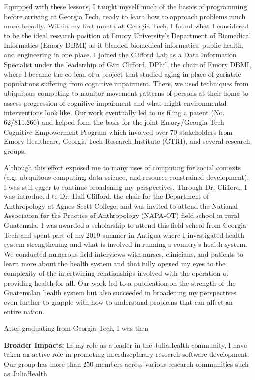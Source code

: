 \documentclass[11pt]{extarticle}
\begin{document}
Equipped with these lessons, I taught myself much of the basics of programming before arriving at Georgia Tech, ready to learn how to approach problems much more broadly.
Within my first month at Georgia Tech, I found what I considered to be the ideal research position at Emory University's Department of Biomedical Informatics (Emory DBMI) as it blended biomedical informatics, public health, and engineering in one place.
I joined the Clifford Lab as a Data Information Specialist under the leadership of Gari Clifford, DPhil, the chair of Emory DBMI,  where I became the co-lead of a project that studied aging-in-place of geriatric populations suffering from cognitive impairment.
There, we used techniques from ubiquitous computing to monitor movement patterns of persons at their home to assess progression of cognitive impairment and what might environmental interventions look like.
Our work eventually led to us filing a patent (No. 62/811,266) and helped form the basis for the joint Emory/Georgia Tech Cognitive Empowerment Program which involved over 70 stakeholders from Emory Healthcare, Georgia Tech Research Institute (GTRI), and several research groups.

Although this effort exposed me to many uses of computing for social contexts (e.g. ubiquitous computing, data science, and resource constrained development), I was still eager to continue broadening my perspectives.
Through Dr. Clifford, I was introduced to Dr. Hall-Clifford, the chair for the Department of Anthropology at Agnes Scott College, and was invited to attend the National Association for the Practice of Anthropology (NAPA-OT) field school in rural Guatemala.
I was awarded a scholarship to attend this field school from Georgia Tech and spent part of my 2019 summer in Antigua where I investigated health system strengthening and what is involved in running a country's health system.
We conducted numerous field interviews with nurses, clinicians, and patients to learn more about the health system and that fully opened my eyes to the complexity of the intertwining relationships involved with the operation of providing health for all.
Our work led to a publication on the strength of the Guatemalan health system but also succeeded in broadening my perspectives even further to grapple with how to understand problems that can affect an entire nation.

After graduating from Georgia Tech, I was then 

\textbf{Broader Impacts:} In my role as a leader in the JuliaHealth community, I have taken an active role in promoting interdiscplinary research software development. Our group has more than $250$ members  across various research communities such as JuliaHealth 
\end{document}

